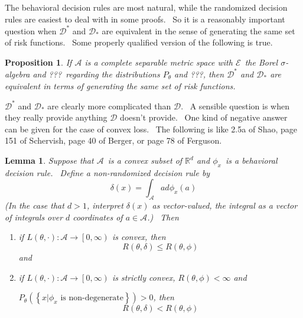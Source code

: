 \documentclass{article}
\newtheorem{lemma}[theorem]{Lemma}
\newtheorem{proposition}[theorem]{Proposition}
\begin{document}
The behavioral decision rules are most natural, while the randomized decision
rules are easiest to deal with in some proofs. \ So it is a reasonably
important question when $\mathcal{D}^{\ast}$ and $\mathcal{D}_{\ast}$ are
equivalent in the sense of generating the same set of risk functions. \ Some
properly qualified version of the following is true.

\begin{proposition}
\label{equivrandomized}If $\mathcal{A}$ is a complete separable metric space
with $\mathcal{E}$\ the Borel $\sigma$-algebra and ???\ regarding the
distributions $P_{\theta}$ and ???, then $\mathcal{D}^{\ast}$ and
$\mathcal{D}_{\ast}$ are equivalent in terms of generating the same set of
risk functions.
\end{proposition}

$\mathcal{D}^{\ast}$ and $\mathcal{D}_{\ast}$ are clearly more complicated
than $\mathcal{D}$. \ A sensible question is when they really provide anything
$\mathcal{D}$ doesn't provide. \ One kind of negative answer can be given for
the case of convex loss. \ The following is like 2.5a of Shao, page 151 of
Schervish, page 40 of Berger, or page 78 of Ferguson.

\begin{lemma}
\label{convexrandom}Suppose that $\mathcal{A}$\ is a convex subset of $%
\mathbb{R}
^{d}$ and $\phi_{x}$\ is a behavioral decision rule. \ Define a non-randomized
decision rule by%
\[
\delta\left(  x\right)  =\int_{\mathcal{A}}ad\phi_{x}\left(  a\right)
\]
(In the case that $d>1$, interpret $\delta\left(  x\right)  $ as
vector-valued, the integral as a vector of integrals over $d$ coordinates of
$a\in\mathcal{A}$.) \ Then

\begin{enumerate}
\item if $L\left(  \theta,\cdot\right)  :\mathcal{A}\rightarrow\left[
0,\infty\right)  $ is convex, then%
\[
R\left(  \theta,\delta\right)  \leq R\left(  \theta,\phi\right)
\]
and

\item if $L\left(  \theta,\cdot\right)  :\mathcal{A}\rightarrow\left[
0,\infty\right)  $ is strictly convex, $R\left(  \theta,\phi\right)  <\infty$ and

$P_{\theta}\left(  \left\{  x|\phi_{x}\text{ is non-degenerate}\right\}
\right)  >0$, then%
\[
R\left(  \theta,\delta\right)  <R\left(  \theta,\phi\right)
\]

\end{enumerate}
\end{lemma}
\end{document}

